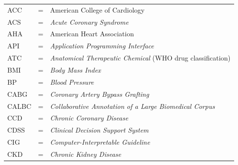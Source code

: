 
\begin{longtable}{llp{3.6in}}
	ACC     & \hspace{1cm} = & American College of Cardiology \\
	ACS     & \hspace{1cm} = & \emph{Acute Coronary Syndrome} \\
	AHA     & \hspace{1cm} = & American Heart Association \\
	API     & \hspace{1cm} = & \emph{Application Programming Interface} \\
	ATC     & \hspace{1cm} = & \emph{Anatomical Therapeutic Chemical} (WHO drug classification) \\
	BMI     & \hspace{1cm} = & \emph{Body Mass Index} \\
	BP      & \hspace{1cm} = & \emph{Blood Pressure} \\
	CABG    & \hspace{1cm} = & \emph{Coronary Artery Bypass Grafting} \\
	CALBC   & \hspace{1cm} = & \emph{Collaborative Annotation of a Large Biomedical Corpus} \\
	CCD     & \hspace{1cm} = & \emph{Chronic Coronary Disease} \\
	CDSS    & \hspace{1cm} = & \emph{Clinical Decision Support System} \\
	CIG     & \hspace{1cm} = & \emph{Computer-Interpretable Guideline} \\
	CKD     & \hspace{1cm} = & \emph{Chronic Kidney Disease} \\

\end{longtable}

